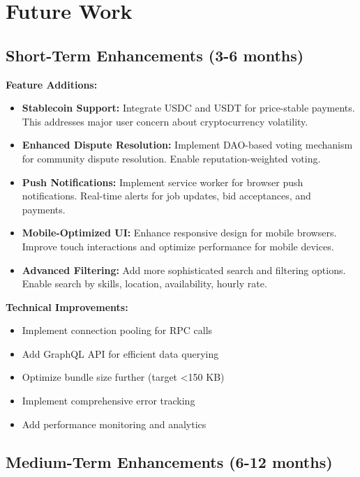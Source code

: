 \documentclass[a4paper,13pt,twoside]{report}
\theoremstyle{definition}
\begin{document}
\section{Future Work}

\subsection{Short-Term Enhancements (3-6 months)}

\textbf{Feature Additions:}
\begin{itemize}
    \item \textbf{Stablecoin Support:} Integrate USDC and USDT for price-stable payments. This addresses major user concern about cryptocurrency volatility.

    \item \textbf{Enhanced Dispute Resolution:} Implement DAO-based voting mechanism for community dispute resolution. Enable reputation-weighted voting.

    \item \textbf{Push Notifications:} Implement service worker for browser push notifications. Real-time alerts for job updates, bid acceptances, and payments.

    \item \textbf{Mobile-Optimized UI:} Enhance responsive design for mobile browsers. Improve touch interactions and optimize performance for mobile devices.

    \item \textbf{Advanced Filtering:} Add more sophisticated search and filtering options. Enable search by skills, location, availability, hourly rate.
\end{itemize}

\textbf{Technical Improvements:}
\begin{itemize}
    \item Implement connection pooling for RPC calls
    \item Add GraphQL API for efficient data querying
    \item Optimize bundle size further (target <150 KB)
    \item Implement comprehensive error tracking
    \item Add performance monitoring and analytics
\end{itemize}

\subsection{Medium-Term Enhancements (6-12 months)}
\end{document}
